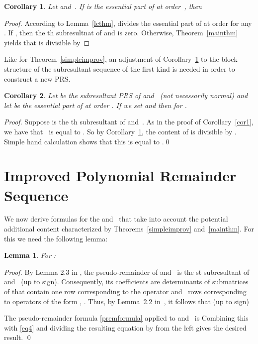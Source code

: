 \documentclass[3p,11pt,preprint]{elsarticle}
\newtheorem{lemma}{Lemma}
\newtheorem{corollary}{Corollary}
\begin{document}
\begin{corollary}
\label{oneespart}
 Let  and~. If  is the essential part of  at order~, then

\end{corollary}

\begin{proof}
 According to Lemma~\ref{lcthm},  divides the essential part of  at order  for any . If , then the th subresultnat of  and  is zero. Otherwise, Theorem~\ref{mainthm} yields that  is divisible by 
 
\end{proof}




Like for Theorem~\ref{simpleimprov}, an adjustment of Corollary~\ref{oneespart} to the block structure of the subresultant sequence of the first kind is needed in order to construct a new PRS.

\begin{corollary}
\label{cor2}
 Let  be the subresultant PRS of  and~ (not necessarily normal) and let  be the essential part of  at order . If we set  and  then  for .
\end{corollary}
\begin{proof}
 Suppose  is the th subresultant of  and~. As in the proof of Corollary~\ref{cor1}, we have that~ is equal to . So by Corollary~\ref{oneespart}, the content of  is divisible by . Simple hand calculation shows that this is equal to .\qed
\end{proof}

\section{Improved Polynomial Remainder Sequence}
\label{improvsec}

We now derive formulas for the  and~ that take into account the potential additional content characterized by Theorems~\ref{simpleimprov} and~\ref{mainthm}. For this we need the following lemma:

\begin{lemma}
\label{quothm}
 For :
 
\end{lemma}
\begin{proof}
 By Lemma 2.3 in \cite{zli}, the pseudo-remainder of  and~ is the st subresultant of  and~ (up to sign). Consequently, its coefficients are determinants of submatrices of  that contain one row corresponding to the operator  and~ rows corresponding to operators of the form , . Thus, by Lemma~2.2 in~\cite{zli}, it follows that (up to sign)
 
The pseudo-remainder formula \eqref{premformula} applied to   and~ is
Combining this with \eqref{eq4} and dividing the resulting equation by  from the left gives the desired result. \qed
\end{proof}
\end{document}
